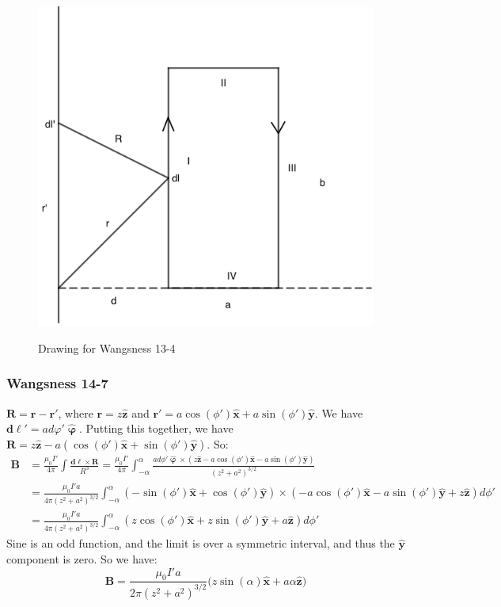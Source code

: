 \documentclass{article}
\theoremstyle{mystyle}
\begin{document}
\begin{figure}[htbp]
    \centering
    {\includegraphics[scale=0.4]{13-4.png}}
    \caption{Drawing for Wangsness 13-4}
\end{figure}
\subsubsection{Wangsness 14-7}
$\mathbf{R} = \mathbf{r}-\mathbf{r}'$, where $\mathbf{r} = z\hat{\mathbf{z}}$ and $\mathbf{r}' = a\cos(\phi')\hat{\mathbf{x}}+a\sin(\phi')\hat{\mathbf{y}}$. We have $\boldsymbol{d\ell}' = ad\varphi' \hat{\boldsymbol{\upvarphi}}$. Putting this together, we have $\mathbf{R} = z\hat{\mathbf{z}} - a(\cos(\phi')\hat{\mathbf{x}}+\sin(\phi')\hat{\mathbf{y}})$. So:
\begin{align*}
    \mathbf{B} &= \frac{\mu_0 I'}{4\pi}\int \frac{\boldsymbol{d\ell}\times \mathbf{R}}{R^3} = \frac{\mu_0I'}{4\pi} \int_{-\alpha}^{\alpha} \frac{ad\phi' \hat{\boldsymbol{\upvarphi}}\times (z\hat{\mathbf{z}}-a\cos(\phi')\hat{\mathbf{x}}-a\sin(\phi')\hat{\mathbf{y}})}{(z^2+a^2)^{3/2}}\\
    &= \frac{\mu_0 I'a}{4\pi(z^2+a^2)^{3/2}}\int_{-\alpha}^{\alpha} (-\sin(\phi')\hat{\mathbf{x}}+\cos(\phi')\hat{\mathbf{y}})\times (-a\cos(\phi')\hat{\mathbf{x}}-a\sin(\phi')\hat{\mathbf{y}}+z\hat{\mathbf{z}})d\phi'\\
    &= \frac{\mu_0 I'a}{4\pi (z^2+a^2)^{3/2}}\int_{-\alpha}^{\alpha} (z\cos(\phi')\hat{\mathbf{x}}+z\sin(\phi')\hat{\mathbf{y}}+a\hat{\mathbf{z}})d\phi'
\end{align*}
Sine is an odd function, and the limit is over a symmetric interval, and thus the $\hat{\mathbf{y}}$ component is zero. So we have:
\begin{equation*}
    \mathbf{B} = \frac{\mu_0 I' a}{2\pi (z^2+a^2)^{3/2}}\big(z\sin(\alpha)\hat{\mathbf{x}}+a\alpha \hat{\mathbf{z}}\big)    
\end{equation*}
\end{document}
